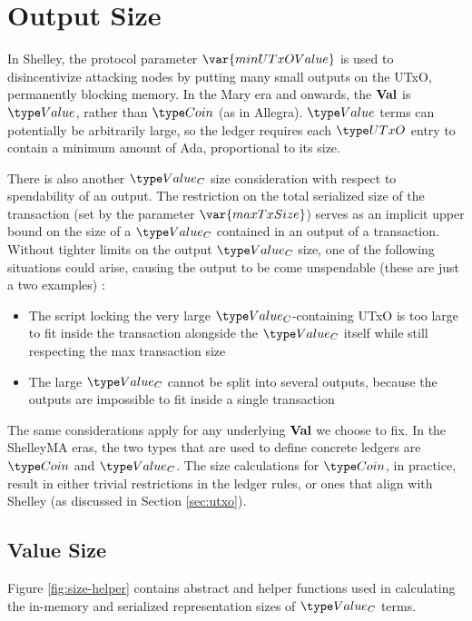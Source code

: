 \section{Output Size}
\label{sec:value-size}

In Shelley, the protocol parameter $\var{minUTxOValue}$ is used to
disincentivize attacking nodes by putting many small outputs on the
UTxO, permanently blocking memory. In the Mary era
and onwards, the $\mathbf{Val}$ is $\Value$, rather than $\Coin$ (as in Allegra). $\Value$ terms
can potentially be arbitrarily large, so the ledger requires each $\UTxO$ entry to
contain a minimum amount of Ada, proportional to its size.

There is also another $\Value_C$ size consideration with respect to spendability
of an output. The restriction on the total serialized size of the transaction (set
by the parameter $\var{maxTxSize}$) serves as an implicit upper bound on the
size of a $\Value_C$ contained in an output of a transaction. Without tighter
limits on the output $\Value_C$ size, one of the following situations could arise,
causing the output to be come unspendable (these are just a two examples) :

\begin{itemize}
  \item The script locking the very large $\Value_C$-containing UTxO is too large
  to fit inside the transaction alongside the $\Value_C$ itself while still respecting
  the max transaction size
  \item The large $\Value_C$ cannot be split into several outputs, because the
  outputs are impossible to fit inside a single transaction
\end{itemize}

The same considerations apply for any underlying $\mathbf{Val}$ we choose to fix.
In the ShelleyMA eras, the two types that are used to define concrete ledgers are $\Coin$ and $\Value_C$.
The size calculations for $\Coin$, in practice,
result in either trivial restrictions in the ledger rules,
or ones that align with Shelley (as discussed in Section \ref{sec:utxo}).

\subsection{Value Size}

Figure \ref{fig:size-helper} contains abstract and helper functions
used in calculating the in-memory and serialized representation
sizes of $\Value_C$ terms.

